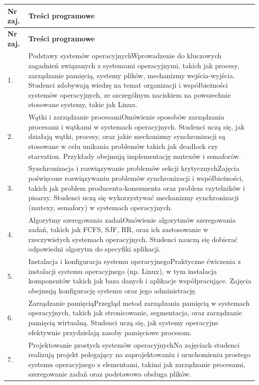 \documentclass[12pt, a4paper]{article}
\newcommand{\thdrule}{\noalign{\global\setlength{\extrarowheight}{0pt}}}
\newcommand{\thdend}{\noalign{\global\setlength{\extrarowheight}{3pt}}}
\begin{document}
{\scriptsize
\begin{longtable}{m{1.5cm}m{14.5cm}}
\thdrule\toprule
\rowcolor{pjatkRed} {\color{white}\textbf{Nr zaj.}} & {\color{white}\textbf{Treści programowe}} \\
\midrule\thdend
\endfirsthead
\thdrule\toprule
\rowcolor{pjatkRed} {\color{white}\textbf{Nr zaj.}} & {\color{white}\textbf{Treści programowe}} \\
\midrule\thdend
\endhead
  \rowcolor{tableRowLight} 1. & Podstawy systemów operacyjnychWprowadzenie do kluczowych zagadnień związanych z systemami operacyjnymi, takich jak procesy, zarządzanie pamięcią, systemy plików, mechanizmy wejścia-wyjścia. Studenci zdobywają wiedzę na temat organizacji i współbieżności systemów operacyjnych, ze szczególnym naciskiem na powszechnie stosowane systemy, takie jak Linux. \\
  \rowcolor{tableRowAlt} 2. & Wątki i zarządzanie procesamiOmówienie sposobów zarządzania procesami i wątkami w systemach operacyjnych. Studenci uczą się, jak działają wątki, procesy, oraz jakie mechanizmy synchronizacji są stosowane w celu unikania problemów takich jak deadlock czy starvation. Przykłady obejmują implementację mutexów i semaforów. \\
  \rowcolor{tableRowLight} 3. & Synchronizacja i rozwiązywanie problemów sekcji krytycznychZajęcia poświęcone rozwiązywaniu problemów synchronizacji i współbieżności, takich jak problem producenta-konsumenta oraz problem czytelników i pisarzy. Studenci uczą się wykorzystywać mechanizmy synchronizacji (mutexy, semafory) w systemach operacyjnych. \\
  \rowcolor{tableRowAlt} 4. & Algorytmy szeregowania zadańOmówienie algorytmów szeregowania zadań, takich jak FCFS, SJF, RR, oraz ich zastosowanie w rzeczywistych systemach operacyjnych. Studenci nauczą się dobierać odpowiedni algorytm do specyfiki aplikacji. \\
  \rowcolor{tableRowLight} 5. & Instalacja i konfiguracja systemu operacyjnegoPraktyczne ćwiczenia z instalacji systemu operacyjnego (np. Linux), w tym instalacja komponentów takich jak baza danych i aplikacje współpracujące. Zajęcia obejmują konfigurację systemu oraz jego administrację. \\
  \rowcolor{tableRowAlt} 6. & Zarządzanie pamięciąPrzegląd metod zarządzania pamięcią w systemach operacyjnych, takich jak stronicowanie, segmentacja, oraz zarządzanie pamięcią wirtualną. Studenci uczą się, jak systemy operacyjne efektywnie przydzielają zasoby pamięciowe procesom. \\
  \rowcolor{tableRowLight} 7. & Projektowanie prostych systemów operacyjnychNa zajęciach studenci realizują projekt polegający na zaprojektowaniu i uruchomieniu prostego systemu operacyjnego z elementami, takimi jak zarządzanie procesami, szeregowanie zadań oraz podstawowa obsługa plików. \\
\bottomrule
\end{longtable}}
\end{document}
